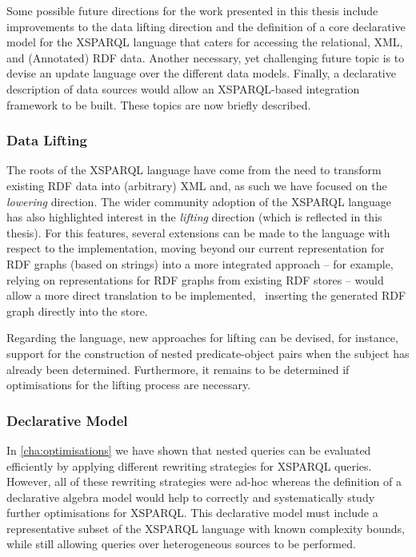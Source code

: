 Some possible future directions for the work presented in this thesis include improvements to the data lifting direction
and the definition of a core declarative model for the XSPARQL language that caters for accessing the relational,
\ac{XML}, and (Annotated) \ac{RDF} data.
%
Another necessary, yet challenging future topic is to devise an update language over the different data models.
Finally, a declarative description of data sources would allow an XSPARQL-based integration framework to be built.
%
These topics are now briefly described.

\subsubsection*{Data Lifting}

The roots of the XSPARQL language have come from the need to transform existing \ac{RDF} data into (arbitrary) \ac{XML}
and, as such we have focused on the \emph{lowering} direction.  The wider community adoption of the XSPARQL language has
also highlighted interest in the \emph{lifting} direction (which is reflected in this thesis).
%
For this features, several extensions can be made to the language with respect to the implementation, moving beyond our
current representation for \ac{RDF} graphs (based on strings) into a more integrated approach -- for example, relying on
representations for \ac{RDF} graphs from existing \ac{RDF} stores -- would allow a more direct translation to be
implemented, \eg~inserting the generated \ac{RDF} graph directly into the store.
%

Regarding the language, new approaches for lifting can be devised, for instance, support for the construction of nested
predicate-object pairs when the subject has already been determined.
%
Furthermore, it remains to be determined if optimisations for the lifting process are necessary.



\subsubsection*{Declarative Model}
%
In \cref{cha:optimisations} we have shown that nested queries can be evaluated efficiently by applying different
rewriting strategies for XSPARQL queries.  However, all of these rewriting strategies were ad-hoc whereas the definition
of a declarative algebra model would help to correctly and systematically study further optimisations for XSPARQL.
%
This declarative model must include a representative subset of the XSPARQL language with known complexity bounds, while
still allowing queries over heterogeneous sources to be performed.
%

